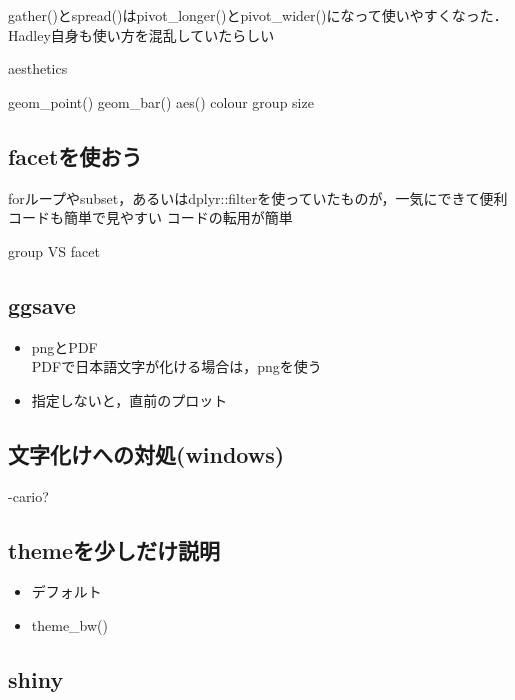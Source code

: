 \documentclass[
]{article}
\providecommand{\tightlist}{%
  \setlength{\itemsep}{0pt}\setlength{\parskip}{0pt}}
\begin{document}
gather()とspread()はpivot\_longer()とpivot\_wider()になって使いやすくなった．
Hadley自身も使い方を混乱していたらしい

aesthetics

geom\_point()
geom\_bar()
aes()
colour
group
size

\hypertarget{facetux3092ux4f7fux304aux3046}{%
\subsection{facetを使おう}\label{facetux3092ux4f7fux304aux3046}}

forループやsubset，あるいはdplyr::filterを使っていたものが，一気にできて便利
コードも簡単で見やすい
コードの転用が簡単

group VS facet

\hypertarget{ggsave}{%
\subsection{ggsave}\label{ggsave}}

\begin{itemize}
\item
  pngとPDF\\
  PDFで日本語文字が化ける場合は，pngを使う
\item
  指定しないと，直前のプロット
\end{itemize}

\hypertarget{ux6587ux5b57ux5316ux3051ux3078ux306eux5bfeux51e6windows}{%
\subsection{文字化けへの対処(windows)}\label{ux6587ux5b57ux5316ux3051ux3078ux306eux5bfeux51e6windows}}

-cario?

\hypertarget{themeux3092ux5c11ux3057ux3060ux3051ux8aacux660e}{%
\subsection{themeを少しだけ説明}\label{themeux3092ux5c11ux3057ux3060ux3051ux8aacux660e}}

\begin{itemize}
\tightlist
\item
  デフォルト\\
\item
  theme\_bw()
\end{itemize}

\hypertarget{shiny}{%
\subsection{shiny}\label{shiny}}
\end{document}
